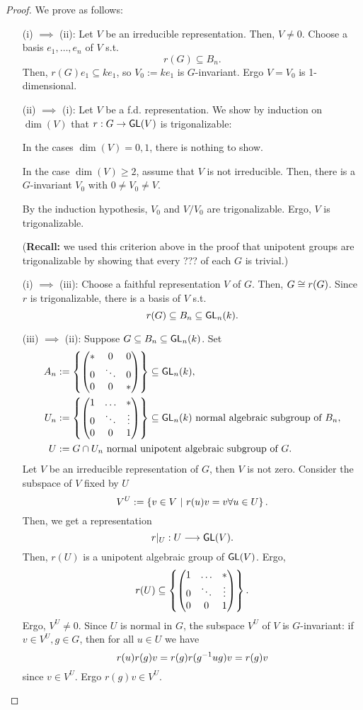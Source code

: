 \begin{proof}
We prove as follows:
\begin{enumerate}
	\item[(i) $\implies$ (ii):] Let $V$ be an irreducible representation. Then, $V \neq 0$. Choose a basis $e_1, \ldots, e_n$ of $V$ s.t.
	\[ r(G) \subseteq B_n. \]
	Then, $r(G)e_1 \subseteq ke_1$, so $V_0 := k e_1$ is $G$-invariant. Ergo $V = V_0$ is 1-dimensional.
	\item[(ii) $\implies$ (i):] Let $V$ be a f.d. representation. We show by induction on $\dim(V)$ that $r : G \overset{}{\rightarrow} \textsf{GL}(V)$ is trigonalizable:
	
	In the cases $\dim(V) = 0,1$, there is nothing to show.
	
	In the case $\dim(V) \geq 2$, assume that $V$ is not irreducible. Then, there is a $G$-invariant $V_0 $ with $0 \neq V_0\neq V$.
	
	By the induction hypothesis, $V_0$ and $V/V_0$ are trigonalizable. Ergo, $V$ is trigonalizable. 
	
	(\textbf{Recall:} we used this criterion above in the proof that unipotent groups are trigonalizable by showing that every ??? of each $G$ is trivial.)
	\item[(i) $\implies$ (iii):] Choose a faithful representation $V$ of $G$. Then, $G \overset{}{\cong} r(G)$. Since $r$ is trigonalizable, there is a basis of $V$ s.t.
	\[r(G) \subseteq B_n \subseteq \textsf{GL}_n(k).\]
	\item[(iii) $\implies$ (ii):] Suppose $G \subseteq B_n \subseteq \textsf{GL}_n(k)$. Set
	\begin{align*}
	A_n &:= \left\lbrace\left(\begin{matrix} * & 0 & 0\\ 0 & \ddots & 0\\ 0 &0 & * \end{matrix}\right)\right\rbrace \subseteq \textsf{GL}_n(k),\\
	U_n &:= \left\lbrace\left(\begin{matrix} 1 & \ldots & *\\ 0 & \ddots & \vdots\\ 0 &0 & 1 \end{matrix}\right) \right\rbrace\subseteq \textsf{GL}_n(k) \text{ normal algebraic subgroup of }B_n,\\
	U &:= G \cap U_n \text{ normal unipotent algebraic subgroup of }G.
	\end{align*}
	Let $V$ be an irreducible representation of $G$, then $V$ is not zero. Consider the subspace of $V$ fixed by $U$
	\[ V^U := \left\lbrace v \in V ~ | ~ r(u)v = v \forall u \in U\right\rbrace. \]
	Then, we get a representation
	\[ r|_U : U \overset{}{\longrightarrow} \textsf{GL}(V). \]
	Then, $r(U)$ is a unipotent algebraic group of $\textsf{GL}(V)$. Ergo,
	\[ r(U) \subseteq \left\lbrace\left(\begin{matrix} 1 & \ldots & *\\ 0 & \ddots & \vdots\\ 0 &0 & 1 \end{matrix}\right) \right\rbrace. \]
Ergo, $V^U \neq 0$. Since $U$ is normal in $G$, the subspace $V^U$ of $V$ is $G$-invariant: if $v \in V^U, g \in G$, then for all $u \in U$ we have
\[ r(u)r(g)v = r(g) r(g^{-1} u g) v= r(g) v \]
since $v \in V^U$. Ergo $r(g)v \in V^U.$


\end{enumerate}
\end{proof}
